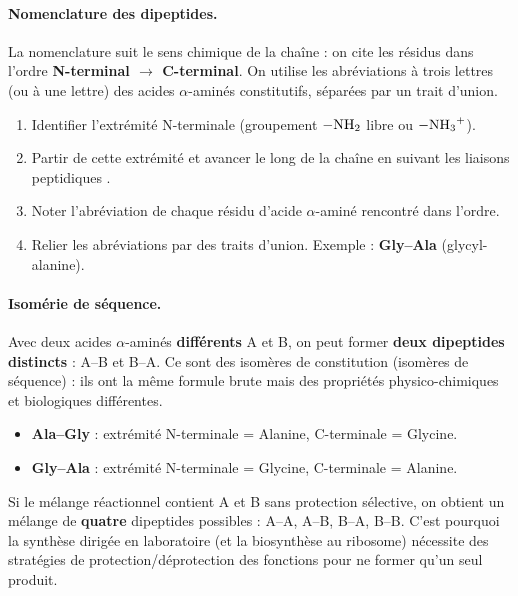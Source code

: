 \documentclass[11pt]{article}
\begin{document}
\paragraph{Nomenclature des dipeptides.}
La nomenclature suit le sens chimique de la chaîne : on cite les résidus dans l'ordre \textbf{N-terminal $\rightarrow$ C-terminal}. On utilise les abréviations à trois lettres (ou à une lettre) des acides $\alpha$-aminés constitutifs, séparées par un trait d'union.

\begin{methode}
\begin{enumerate}
    \item Identifier l'extrémité N-terminale (groupement $\ce{-NH2}$ libre ou $\ce{-NH3+}$).
    \item Partir de cette extrémité et avancer le long de la chaîne en suivant les liaisons peptidiques .
    \item Noter l'abréviation de chaque résidu d'acide $\alpha$-aminé rencontré dans l'ordre.
    \item Relier les abréviations par des traits d'union. Exemple : \textbf{Gly–Ala} (glycyl-alanine).
\end{enumerate}
\end{methode}

\paragraph{Isomérie de séquence.}
Avec deux acides $\alpha$-aminés \textbf{différents} A et B, on peut former \textbf{deux dipeptides distincts} : A–B et B–A. Ce sont des isomères de constitution (isomères de séquence) : ils ont la même formule brute mais des propriétés physico-chimiques et biologiques différentes.
\begin{itemize}
    \item \textbf{Ala–Gly} : extrémité N-terminale = Alanine, C-terminale = Glycine.
    \item \textbf{Gly–Ala} : extrémité N-terminale = Glycine, C-terminale = Alanine.
\end{itemize}
Si le mélange réactionnel contient A et B sans protection sélective, on obtient un mélange de \textbf{quatre} dipeptides possibles : A–A, A–B, B–A, B–B. C'est pourquoi la synthèse dirigée en laboratoire (et la biosynthèse au ribosome) nécessite des stratégies de protection/déprotection des fonctions pour ne former qu'un seul produit.
\end{document}

